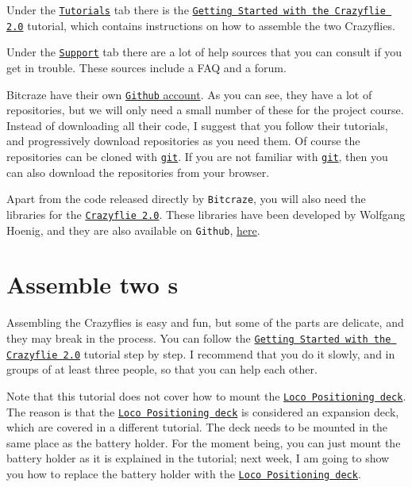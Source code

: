 Under the \href{}{\texttt{Tutorials}} tab there is the \href{https://www.bitcraze.io/getting-started-with-the-crazyflie-2-0/}{\texttt{Getting Started with the Crazyflie 2.0}} tutorial, which contains instructions on how to assemble the two Crazyflies.

Under the \href{}{\texttt{Support}} tab there are a lot of help sources that you can consult if you get in trouble.
These sources include a FAQ and a forum.

Bitcraze have their own \href{https://github.com/bitcraze}{\texttt{Github} account}.
As you can see, they have a lot of repositories, but we will only need a small number of these for the project course.
Instead of downloading all their code, I suggest that you follow their tutorials, and progressively download repositories as you need them.
Of course the repositories can be cloned with \href{https://git-scm.com/}{\texttt{git}}.
If you are not familiar with \href{}{\texttt{git}}, then you can also download the repositories from your browser.

Apart from the code released directly by \texttt{Bitcraze}, you will also need the \ROS{} libraries for the \href{}{\texttt{Crazyflie 2.0}}.
These libraries have been developed by Wolfgang Hoenig, and they are also available on \texttt{Github}, \href{https://github.com/whoenig/crazyflie_ros}{here}.








\section*{Assemble two \CF s }

Assembling the Crazyflies is easy and fun, but some of the parts are delicate, and they may break in the process.
You can follow the \href{https://www.bitcraze.io/getting-started-with-the-crazyflie-2-0/}{\texttt{Getting Started with the Crazyflie 2.0}} tutorial step by step.
I recommend that you do it slowly, and in groups of at least three people, so that you can help each other.

Note that this tutorial does not cover how to mount the \href{}{\texttt{Loco Positioning deck}}.
The reason is that the \href{}{\texttt{Loco Positioning deck}} is considered an expansion deck, which are covered in a different tutorial.
The deck needs to be mounted in the same place as the battery holder.
For the moment being, you can just mount the battery holder as it is explained in the tutorial; next week, I am going to show you how to replace the battery holder with the \href{}{\texttt{Loco Positioning deck}}.

